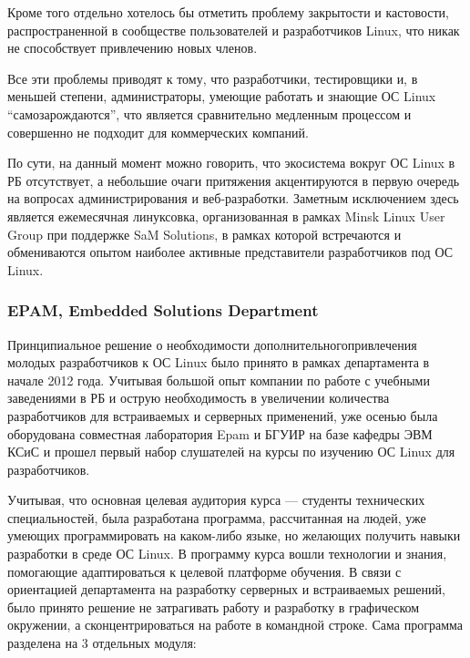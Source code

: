 \documentclass[10pt, a5paper]{article}
\begin{document}
Кроме того отдельно хотелось бы отметить проблему закрытости и кастовости, распространенной в сообществе пользователей и разработчиков Linux, что никак не способствует привлечению новых членов.

Все эти проблемы приводят к тому, что разработчики, тестировщики и, в меньшей степени, администраторы, умеющие работать и знающие ОС Linux “самозарождаются”, что  является сравнительно медленным процессом и совершенно не подходит для коммерческих компаний.

По сути, на данный момент можно говорить, что экосистема вокруг ОС Linux в РБ отсутствует, а небольшие очаги притяжения акцентируются в первую очередь на вопросах администрирования и веб-разработки. Заметным исключением здесь является ежемесячная линуксовка, организованная в рамках Minsk Linux User Group при поддержке SaM Solutions, в рамках которой встречаются и обмениваются опытом наиболее активные представители разработчиков под ОС Linux.

\subsubsection*{EPAM, Embedded Solutions Department}

Принципиальное решение о необходимости дополнительного\linebreak привлечения молодых разработчиков к ОС Linux было принято в рамках департамента в начале 2012 года. Учитывая большой опыт компании по работе с учебными заведениями в РБ и острую необходимость в увеличении количества разработчиков для встраиваемых и серверных применений, уже осенью была оборудована совместная лаборатория Epam и БГУИР на базе кафедры ЭВМ КСиС и прошел первый набор слушателей на курсы по изучению ОС Linux для разработчиков.

Учитывая, что основная целевая аудитория курса --- студенты технических специальностей, была разработана программа, рассчитанная на людей, уже умеющих программировать на каком-либо языке, но желающих получить навыки разработки в среде ОС Linux. В программу курса вошли технологии и знания, помогающие адаптироваться к целевой платформе обучения.
В связи с ориентацией департамента на разработку серверных и встраиваемых решений, было принято решение не затрагивать работу и разработку в графическом окружении, а сконцентрироваться на работе в командной строке.
Сама программа разделена на 3 отдельных модуля:
\end{document}
